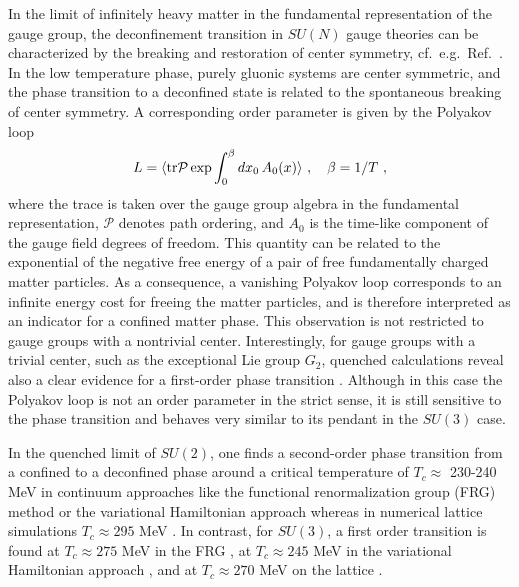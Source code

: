 \documentclass[final,twocolumn,merge,sort&compress]{elsarticle}
\newcommand{\tr}{\ensuremath{\operatorname{tr}}}
\begin{document}
In the limit of infinitely heavy matter in the fundamental
representation of the gauge group, the deconfinement transition in
$SU(N)$ gauge theories can be characterized by the breaking and
restoration of center symmetry, cf.~e.g.~Ref.~\cite{PhysRevD.24.450}.
In the low temperature phase, purely gluonic systems are center
symmetric, and the phase transition to a deconfined state is related
to the spontaneous breaking of center symmetry. A corresponding order
parameter is given by the Polyakov loop
\begin{equation}
\label{eq:ploop}
L = \langle\text{\tr }\mathcal P \exp \int_0^\beta dx_0\,A_0(x)\rangle
\ , \quad \beta=1/T \ , 
\end{equation}
where the trace is taken over the gauge group algebra in the fundamental
representation, $\mathcal P$
denotes path ordering, and $A_0$ is the time-like component of the
gauge field degrees of freedom.  This quantity can be related to the
exponential of the negative free energy of a pair of free
fundamentally charged matter particles. As a consequence, a vanishing
Polyakov loop corresponds to an infinite energy cost for freeing the
matter particles, and is therefore interpreted as an indicator for a
confined matter phase.  This observation is not restricted to gauge
groups with a nontrivial center. Interestingly, for gauge groups with
a trivial center, such as the exceptional Lie group $G_2$, quenched
calculations reveal also a clear evidence for a first-order phase
transition \cite{Pepe:2006er, Greensite:2006sm, Cossu:2007dk,
  Danzer:2008bk, Maas:2012wr, Maas:2012ts}.  Although in this case the
Polyakov loop is not an order parameter in the strict sense, it is
still sensitive to the phase transition and behaves very similar to
its pendant in the $SU(3)$ case.

In the quenched limit of $SU(2)$, one finds a second-order phase
transition from a confined to a deconfined phase around a critical
temperature of $T_c\approx$ 230-240 MeV in continuum approaches like
the functional renormalization group (FRG) method or the variational
Hamiltonian approach \cite{Braun:2007bx, Fister:2013bh,
  Reinhardt:2016xci} whereas in numerical lattice simulations
$T_c \approx 295$ MeV \cite{Lucini:2012gg}. In contrast, for $SU(3)$, a
first order transition is found at $T_c\approx 275$ MeV in the FRG
\cite{Fister:2013bh}, at $T_c\approx 245$ MeV in the variational
Hamiltonian approach \cite{Reinhardt:2016xci}, and at $T_c\approx 270$
MeV on the lattice \cite{Lucini:2012gg}.
\end{document}
